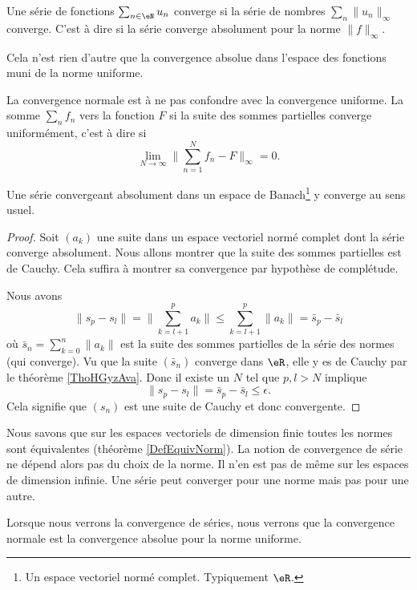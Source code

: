 \begin{definition} \label{DefVBrJUxo}
    Une série de fonctions \( \sum_{n\in \eN}u_n \) converge  si la série de nombres \( \sum_n\| u_n \|_{\infty}\) converge. C'est à dire si la série converge absolument pour la norme \( \| f \|_{\infty}\).
\end{definition}
Cela n'est rien d'autre que la convergence absolue dans l'espace des fonctions muni de la norme uniforme.

La convergence normale est à ne pas confondre avec la convergence uniforme. La somme \( \sum_nf_n\)  vers la fonction \( F\) si la suite des sommes partielles converge uniformément, c'est à dire si 
\begin{equation}        \label{EqLNCJooVCTiIw}
    \lim_{N\to \infty} \| \sum_{n=1}^Nf_n-F \|_{\infty}=0.
\end{equation}

\begin{proposition} \label{PropAKCusNM}
    Une série convergeant absolument dans un espace de Banach\footnote{Un espace vectoriel normé complet. Typiquement \( \eR\).} y converge au sens usuel.
\end{proposition}

\begin{proof}
    Soit \( (a_k)\) une suite dans un espace vectoriel normé complet dont la série converge absolument. Nous allons montrer que la suite des sommes partielles est de Cauchy. Cela suffira à montrer sa convergence par hypothèse de complétude.

    Nous avons
    \begin{equation}
        \| s_p-s_l \|=\| \sum_{k=l+1}^{p}a_k\|  \leq\sum_{k=l+1}^p\| a_k \|=\bar s_p-\bar s_l
    \end{equation}
    où \( \bar s_n=\sum_{k=0}^n \| a_k \|\) est la suite des sommes partielles de la série des normes (qui converge). Vu que la suite \( (\bar s_n)\) converge dans \( \eR\), elle y es de Cauchy par le théorème \ref{ThoHGyzAva}. Donc il existe un \( N\) tel que \( p,l>N\) implique
    \begin{equation}
        \| s_p-s_l \|=\bar s_p-\bar s_l\leq \epsilon.
    \end{equation}
    Cela signifie que \( (s_n)\) est une suite de Cauchy et donc convergente.
\end{proof}

\begin{remark}
    Nous savons que sur les espaces vectoriels de dimension finie toutes les normes sont équivalentes (théorème \ref{DefEquivNorm}). La notion de convergence de série ne dépend alors pas du choix de la norme. Il n'en est pas de même sur les espaces de dimension infinie. Une série peut converger pour une norme mais pas pour une autre.
\end{remark}
Lorsque nous verrons la convergence de séries, nous verrons que la convergence normale est la convergence absolue pour la norme uniforme.

